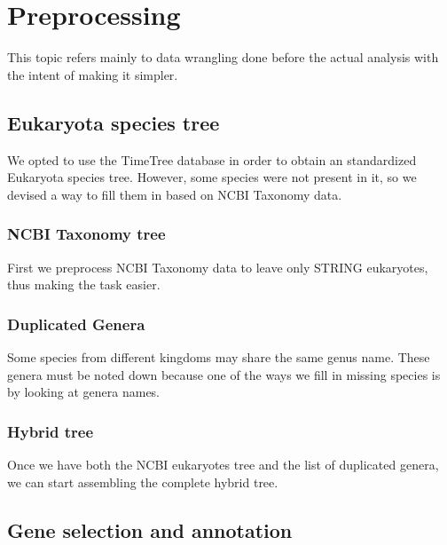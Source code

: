 \documentclass[
]{article}
\begin{document}
\hypertarget{preprocessing}{%
\section{Preprocessing}\label{preprocessing}}

This topic refers mainly to data wrangling done before the actual
analysis with the intent of making it simpler.

\hypertarget{eukaryota-species-tree}{%
\subsection{Eukaryota species tree}\label{eukaryota-species-tree}}

We opted to use the TimeTree database in order to obtain an standardized
Eukaryota species tree. However, some species were not present in it, so
we devised a way to fill them in based on NCBI Taxonomy data.

\hypertarget{ncbi-taxonomy-tree}{%
\subsubsection{NCBI Taxonomy tree}\label{ncbi-taxonomy-tree}}

First we preprocess NCBI Taxonomy data to leave only STRING eukaryotes,
thus making the task easier. 

\hypertarget{duplicated-genera}{%
\subsubsection{Duplicated Genera}\label{duplicated-genera}}

Some species from different kingdoms may share the same genus name.
These genera must be noted down because one of the ways we fill in
missing species is by looking at genera names.


\hypertarget{hybrid-tree}{%
\subsubsection{Hybrid tree}\label{hybrid-tree}}

Once we have both the NCBI eukaryotes tree and the list of duplicated
genera, we can start assembling the complete hybrid tree.


\hypertarget{gene-selection-and-annotation}{%
\subsection{Gene selection and
annotation}\label{gene-selection-and-annotation}}
\end{document}
